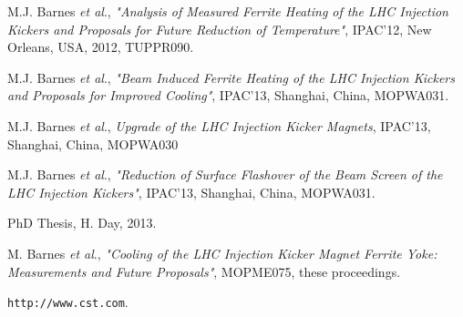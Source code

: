 \documentclass[a4paper,
              ]{jacow}
\begin{document}
\begin{thebibliography}{9}

M.J. Barnes \emph{et al}., \emph{"Analysis of Measured Ferrite Heating of the LHC Injection Kickers and Proposals for Future Reduction of Temperature"}, IPAC'12, New Orleans, USA, 2012, TUPPR090.

M.J. Barnes \emph{et al}., \emph{"Beam Induced Ferrite Heating of the LHC Injection Kickers and Proposals for Improved Cooling"}, IPAC'13, Shanghai, China, MOPWA031.

M.J. Barnes \emph{et al}., \emph{Upgrade of the LHC Injection Kicker Magnets}, IPAC'13, Shanghai, China, MOPWA030

M.J. Barnes \emph{et al}., \emph{"Reduction of Surface Flashover of the Beam Screen of the LHC Injection Kickers"}, IPAC'13, Shanghai, China, MOPWA031.

PhD Thesis, H. Day, 2013.

M. Barnes \emph{et al}., \emph{"Cooling of the LHC Injection Kicker Magnet Ferrite Yoke: Measurements and Future Proposals"}, MOPME075, these proceedings.

\texttt{http://www.cst.com}.

\end{thebibliography}
\end{document}
